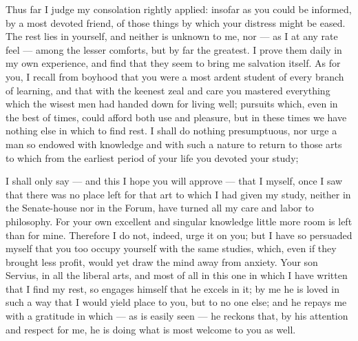  Thus far I judge my consolation rightly applied: insofar as you could be informed, by a most devoted friend, of those things by which your distress might be eased. The rest lies in yourself, and neither is unknown to me, nor --- as I at any rate feel --- among the lesser comforts, but by far the greatest. I prove them daily in my own experience, and find that they seem to bring me salvation itself. As for you, I recall from boyhood that you were a most ardent student of every branch of learning, and that with the keenest zeal and care you mastered everything which the wisest men had handed down for living well; pursuits which, even in the best of times, could afford both use and pleasure, but in these times we have nothing else in which to find rest. I shall do nothing presumptuous, nor urge a man so endowed with knowledge and with such a nature to return to those arts to which from the earliest period of your life you devoted your study;

 I shall only say --- and this I hope you will approve --- that I myself, once I saw that there was no place left for that art to which I had given my study, neither in the Senate-house nor in the Forum, have turned all my care and labor to philosophy. For your own excellent and singular knowledge little more room is left than for mine. Therefore I do not, indeed, urge it on you; but I have so persuaded myself that you too occupy yourself with the same studies, which, even if they brought less profit, would yet draw the mind away from anxiety. Your son Servius, in all the liberal arts, and most of all in this one in which I have written that I find my rest, so engages himself that he excels in it; by me he is loved in such a way that I would yield place to you, but to no one else; and he repays me with a gratitude in which --- as is easily seen --- he reckons that, by his attention and respect for me, he is doing what is most welcome to you as well.
